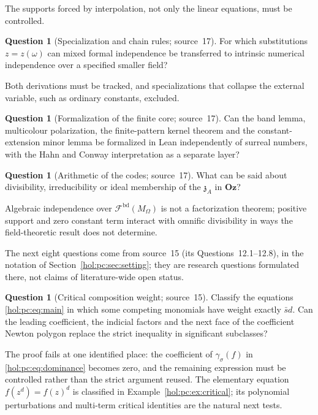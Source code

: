 \documentclass[11pt]{article}
\numberwithin{equation}{section}
\theoremstyle{definition}
\newtheorem{question}[theorem]{Question}
\theoremstyle{remark}
\newcommand{\Oz}{\mathbf{Oz}}
\begin{document}
The supports forced by interpolation, not only the linear equations, must be
controlled.

\begin{question}[Specialization and chain rules; source~17]
\label{hol:fh:q:specialization}
For which substitutions $z=z(\omega)$ can mixed formal independence be
transferred to intrinsic numerical independence over a specified smaller
field?
\end{question}

Both derivations must be tracked, and specializations that collapse the
external variable, such as ordinary constants, excluded.

\begin{question}[Formalization of the finite core; source~17]
\label{hol:fh:q:formal}
Can the band lemma, multicolour polarization, the finite-pattern kernel
theorem and the constant-extension minor lemma be formalized in Lean
independently of surreal numbers, with the Hahn and Conway interpretation as a
separate layer?
\end{question}

\begin{question}[Arithmetic of the codes; source~17]
\label{hol:fh:q:arithmetic}
What can be said about divisibility, irreducibility or ideal membership of the
$\mathfrak z_A$ in $\Oz$?
\end{question}

Algebraic independence over $\mathcal F^{\mathrm{bd}}(M_\Omega)$ is not a
factorization theorem; positive support and zero constant term interact with
omnific divisibility in ways the field-theoretic result does not determine.

The next eight questions come from source~15 (its Questions~12.1--12.8), in
the notation of Section~\ref{hol:pc:sec:setting}; they are research questions
formulated there, not claims of literature-wide open status.

\begin{question}[Critical composition weight; source~15]
\label{hol:pc:q:critical}
Classify the equations \eqref{hol:pc:eq:main} in which some competing
monomials have weight exactly $\bar sd$. Can the leading coefficient, the
indicial factors and the next face of the coefficient Newton polygon replace
the strict inequality in significant subclasses?
\end{question}

The proof fails at one identified place: the coefficient of $\gamma_\sigma(f)$
in \eqref{hol:pc:eq:dominance} becomes zero, and the remaining expression must
be controlled rather than the strict argument reused. The elementary equation
$f(z^d)=f(z)^d$ is classified in Example~\ref{hol:pc:ex:critical}; its
polynomial perturbations and multi-term critical identities are the natural
next tests.
\end{document}
